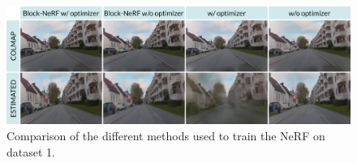\begin{figure}[h]
    \centering
    \includegraphics[width=1.0\textwidth]{figures/trip086-comparison.png}
    \caption{Comparison of the different methods used to train the NeRF on dataset 1.}
    \label{fig:trip086-comparison}
\end{figure}